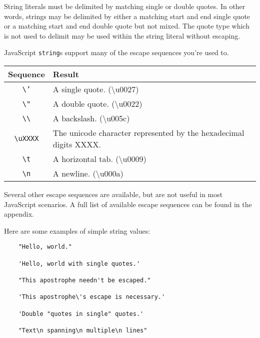 \documentclass[11pt,letter]{book}
\begin{document}
    String literals must be delimited by matching single or double quotes. In other words, strings 
    may be delimited by either a matching start and end single quote or a matching start and end 
    double quote but not mixed. The quote type which is not used to delimit may be used within the 
    string literal without escaping.
    
    JavaScript \texttt{string}s support many of the escape sequences you're used to.
    
    \vspace{10pt}
    \small{
        \begin{tabular}{c|l}
            Sequence & Result \\
            \hline
            \texttt{\textbackslash{'}}  & A single quote. (\textbackslash{u0027}) \\
            \texttt{\textbackslash{"}}  & A double quote. (\textbackslash{u0022}) \\
            \texttt{\textbackslash\textbackslash} 
                                        & A backslash. (\textbackslash{u005c}) \\
            \texttt{\textbackslash{uXXXX}}
                                        & The unicode character represented by the hexadecimal
                                            digits XXXX. \\
            \texttt{\textbackslash{t}}  & A horizontal tab. (\textbackslash{u0009}) \\
            \texttt{\textbackslash{n}}  & A newline. (\textbackslash{u000a}) \\
        \end{tabular}
    }
    \vspace{10pt}
    
    Several other escape sequences are available, but are not useful in most JavaScript scenarios. 
    A full list of available escape sequences can be found in the appendix.
    
    Here are some examples of simple string values:
    
    \begin{verbatim}
    "Hello, world."
    
    'Hello, world with single quotes.'
    
    "This apostrophe needn't be escaped."
    
    'This apostrophe\'s escape is necessary.'
    
    'Double "quotes in single" quotes.'
    
    "Text\n spanning\n multiple\n lines"
    
    \end{verbatim}
    
\end{document}
